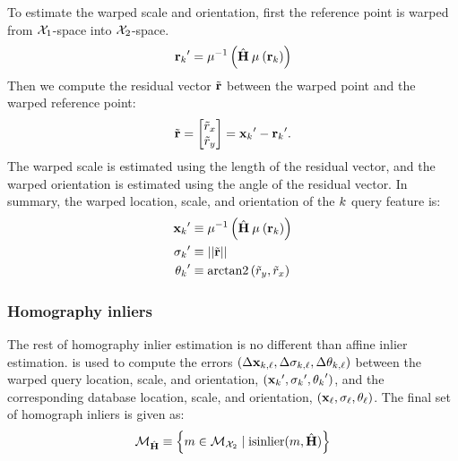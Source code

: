         To estimate the warped scale and orientation, first the reference
          point is warped from $\mathcal{X}_{1}$-space into $\mathcal{X}_{2}$-space.
        \begin{equation}
            {{\ensuremath{\mathbf{r}}_{k}}}' = \mathbin{\mu^{-1}}\left(\hat{\mathbf{H}} \mathbin{\mu}\left({\mathbf{r}_{k}}\right)\right)
        \end{equation}
        Then we compute the residual vector $\tilde{\mathbf{r}}$ between the warped point and the warped reference point:
        \begin{equation}
            \tilde{\mathbf{r}} = \begin{bmatrix} \tilde{r}_x \\ \tilde{r}_y \end{bmatrix} = {{\mathbf{x}_{k}}}'- {{\mathbf{r}_{k}}}'.
        \end{equation}
        The warped scale is estimated using the length of the residual vector, and the warped orientation is
          estimated using the angle of the residual vector.
        In summary, the warped location, scale, and orientation of the $k$\th{} query feature is:
        \begin{equation}\label{eqn:homogwarp}
            \begin{aligned}
                {{\ensuremath{\mathbf{x}}_{k}}}'      &\equiv \mathbin{\mu^{-1}}\left(\hat{\mathbf{H}} \mathbin{\mu}\left({\mathbf{r}_{k}}\right)\right) \\
                 {{\sigma_{k}}}'  &\equiv ||\tilde{\mathbf{r}}||_{}\\
                {{\theta_{k}}}'     &\equiv \mathbin{\operatorname{arctan2}}\left(\tilde{r}_y, \tilde{r}_x\right)
            \end{aligned}
        \end{equation}

        \subsubsection{Homography inliers}
        The rest of homography inlier estimation is no different than affine inlier estimation.
         is used to compute the errors $( %
        \Delta \pt_{\idxI, \idxII}, %
        \Delta \scale_{\idxI, \idxII}, %
        \Delta \ori_{\idxI, \idxII})$
        between the warped query location, scale, and orientation, $({{\mathbf{x}_{k}}}', {{\sigma_{k}}}', {{\theta_{k}}}')$, %
        and the corresponding database location, scale, and orientation, %
        $({{\mathbf{x}_{\ell}}}, {{\sigma_{\ell}}}, {{\theta_{\ell}}})$.
        The final set of homograph inliers is given as:
        \begin{equation}\label{eqn:homoginliers}
            \mathcal{M}_{\hat{\mathbf{H}}} \equiv \left\{m  \in \mathcal{M}_{\mathcal{X}_{2}} \mid \operatorname{isinlier}(m, \hat{\mathbf{H}})\right\}
        \end{equation}

